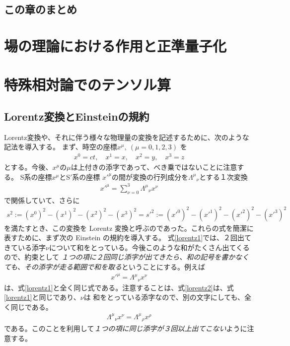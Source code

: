 \documentclass[report,paper=a4, fontsize=12pt, line_length=16cm, number_of_lines=33,dvipdfmx]{jlreq}
\numberwithin{equation}{chapter}
\newcommand{\Sp}{S$'$}
\begin{document}
\section{この章のまとめ}



\chapter{場の理論における作用と正準量子化}


\appendix
\chapter{特殊相対論でのテンソル算}
\label{app:tensor}
\section{Lorentz変換とEinsteinの規約}
Lorentz変換や、それに伴う様々な物理量の変換を記述するために、次のような記法を導入する。
まず、時空の座標$x^{\mu},\ (\mu=0,1,2,3)$ を
\begin{align}
x^{0}=ct,\quad x^{1}=x,\quad x^{2}=y,\quad x^{3}=z
\end{align}
とする。今後、$x^{\mu}$の$\mu$は上付きの添字であって、べき乗ではないことに注意する。
S系の座標$x^{\mu}$と\Sp 系の座標 $x'^{\mu}$の間が変換の行列成分を$\Lambda^{\mu}{}_{\nu}$とする１次変換
\begin{align}
 x'^{\mu}=\sum_{\nu=0}^{3}\Lambda^{\mu}{}_{\nu}x^{\nu}
\label{lorentz1}
\end{align}
で関係していて、さらに
\begin{align}
s^{2}
:=(x^{0})^{2}-(x^{1})^{2}-(x^{2})^{2}-(x^{3})^{2}
=s'^{2}
:=(x'^{0})^{2}-(x'^{1})^{2}-(x'^{2})^{2}-(x'^{3})^{2}
\end{align}
を満たすとき、この変換を Lorentz 変換と呼ぶのであった。これらの式を簡潔に表すために、まず次の Einstein の規約を導入する。
式\eqref{lorentz1}では、２回出てきている添字$\nu$について和をとっている。今後このような和がたくさん出てくるので、約束として
\emph{１つの項に２回同じ添字が出てきたら、和の記号を書かなくても、その添字が走る範囲で和を取る}ということにする。例えば
\begin{align}
 x'^{\mu}=\Lambda^{\mu}{}_{\nu}x^{\nu}
\label{lorentz2}
\end{align}
は、式\eqref{lorentz1}と全く同じ式である。注意することは、式\eqref{lorentz2}は、式\eqref{lorentz1}と同じであり、$\nu$は
和をとっている添字なので、別の文字にしても、全く同じである。
\begin{align}
\Lambda^{\mu}{}_{\nu}x^{\nu}
=\Lambda^{\mu}{}_{\rho}x^{\rho}
\end{align}
である。このことを利用して\emph{１つの項に同じ添字が３回以上出てこない}ように注意する。
\end{document}
